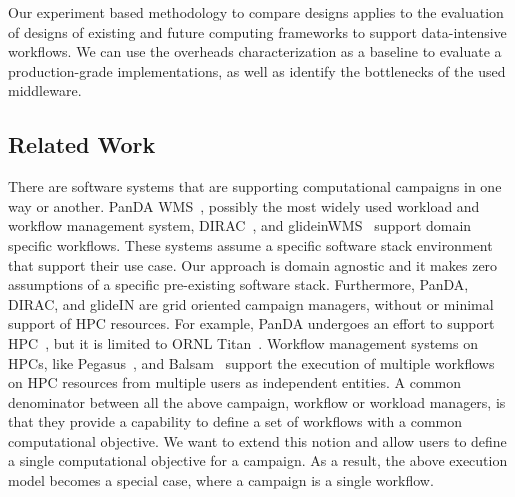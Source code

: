 Our experiment based methodology to compare designs applies to the evaluation of designs of existing and future computing frameworks to support data-intensive workflows.
We can use the overheads characterization as a baseline to evaluate a production-grade implementations, as well as identify the bottlenecks of the used middleware.




\subsection{Related Work}

There are software systems that are supporting computational campaigns in one way or another. 
PanDA WMS~\cite{maeno2008panda,maeno2014evolution}, possibly the most widely used workload and workflow management system, DIRAC~\cite{casajus2010dirac}, and glideinWMS~\cite{sfiligoi2008glidein} support domain specific workflows.
These systems assume a specific software stack environment that support their use case.
Our approach is domain agnostic and it makes zero assumptions of a specific pre-existing software stack. 
Furthermore, PanDA, DIRAC, and glideIN are grid oriented campaign managers, without or minimal support of HPC resources.
For example, PanDA undergoes an effort to support HPC~\cite{de2016accelerating}, but it is limited to ORNL Titan~\cite{titan}.
Workflow management systems on HPCs, like Pegasus~\cite{deelman2015pegasus}, and Balsam~\cite{salim2019balsam} support the execution of multiple workflows on HPC resources from multiple users as independent entities.
A common denominator between all the above campaign, workflow or workload managers, is that they provide a capability to define a set of workflows with a common computational objective.
We want to extend this notion and allow users to define a single computational objective for a campaign.
As a result, the above execution model becomes a special case, where a campaign is a single workflow.
